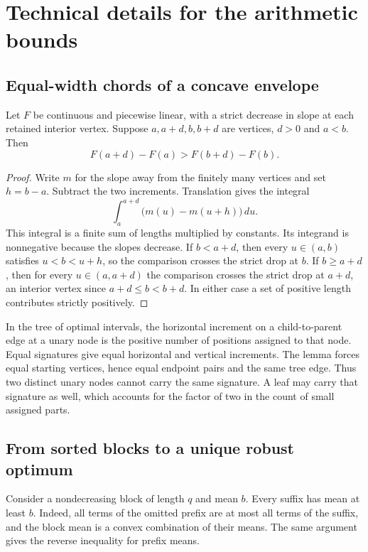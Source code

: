 \section{Technical details for the arithmetic bounds}\label{app:arithproof}

\subsection{Equal-width chords of a concave envelope}
\begin{lemma}\label{lem:chorddetail}
Let $F$ be continuous and piecewise linear, with a strict decrease in slope at each retained interior vertex. Suppose $a,a+d,b,b+d$ are vertices, $d>0$ and $a<b$. Then
\[
 F(a+d)-F(a)>F(b+d)-F(b).
\]
\end{lemma}
\begin{proof}
Write $m$ for the slope away from the finitely many vertices and set $h=b-a$. Subtract the two increments. Translation gives the integral
\[
 \int_a^{a+d}\bigl(m(u)-m(u+h)\bigr)\,du.
\]
This integral is a finite sum of lengths multiplied by constants. Its integrand is nonnegative because the slopes decrease. If $b<a+d$, then every $u\in(a,b)$ satisfies $u<b<u+h$, so the comparison crosses the strict drop at $b$. If $b\ge a+d$, then for every $u\in(a,a+d)$ the comparison crosses the strict drop at $a+d$, an interior vertex since $a+d\le b<b+d$. In either case a set of positive length contributes strictly positively.
\end{proof}
In the tree of optimal intervals, the horizontal increment on a child-to-parent edge at a unary node is the positive number of positions assigned to that node. Equal signatures give equal horizontal and vertical increments. The lemma forces equal starting vertices, hence equal endpoint pairs and the same tree edge. Thus two distinct unary nodes cannot carry the same signature. A leaf may carry that signature as well, which accounts for the factor of two in the count of small assigned parts.

\subsection{From sorted blocks to a unique robust optimum}
Consider a nondecreasing block of length $q$ and mean $b$. Every suffix has mean at least $b$. Indeed, all terms of the omitted prefix are at most all terms of the suffix, and the block mean is a convex combination of their means. The same argument gives the reverse inequality for prefix means.

